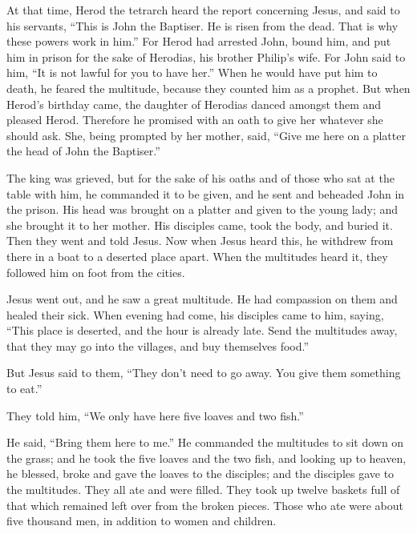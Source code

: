  At that time, Herod the tetrarch heard the report
concerning Jesus,  and said to his servants, ``This is
John the Baptiser. He is risen from the dead. That is why these powers
work in him.''  For Herod had arrested John, bound him,
and put him in prison for the sake of Herodias, his brother Philip's
wife.  For John said to him, ``It is not lawful for you to
have her.''  When he would have put him to death, he
feared the multitude, because they counted him as a prophet.
 But when Herod's birthday came, the daughter of Herodias
danced amongst them and pleased Herod.  Therefore he
promised with an oath to give her whatever she should ask.
 She, being prompted by her mother, said, ``Give me here
on a platter the head of John the Baptiser.''

 The king was grieved, but for the sake of his oaths and
of those who sat at the table with him, he commanded it to be given,
 and he sent and beheaded John in the prison.
 His head was brought on a platter and given to the young
lady; and she brought it to her mother.  His disciples
came, took the body, and buried it. Then they went and told Jesus.
 Now when Jesus heard this, he withdrew from there in a
boat to a deserted place apart. When the multitudes heard it, they
followed him on foot from the cities.

 Jesus went out, and he saw a great multitude. He had
compassion on them and healed their sick.  When evening
had come, his disciples came to him, saying, ``This place is deserted,
and the hour is already late. Send the multitudes away, that they may go
into the villages, and buy themselves food.''

 But Jesus said to them, ``They don't need to go away.
You give them something to eat.''

 They told him, ``We only have here five loaves and two
fish.''

 He said, ``Bring them here to me.''  He
commanded the multitudes to sit down on the grass; and he took the five
loaves and the two fish, and looking up to heaven, he blessed, broke and
gave the loaves to the disciples; and the disciples gave to the
multitudes.  They all ate and were filled. They took up
twelve baskets full of that which remained left over from the broken
pieces.  Those who ate were about five thousand men, in
addition to women and children.


